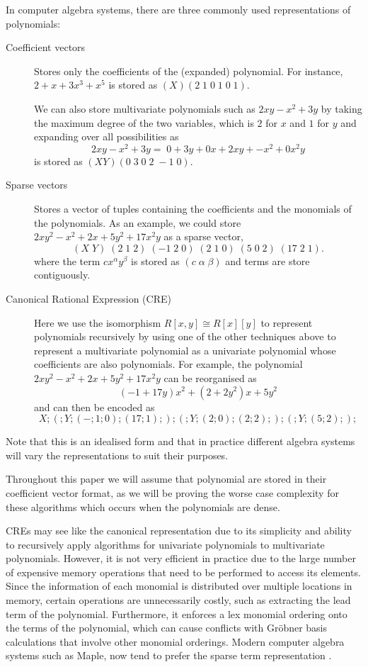 In computer algebra systems, there are three commonly used representations of polynomials:
\begin{description}
    \item[Coefficient vectors] Stores only the coefficients of the (expanded) polynomial. For instance, $2 + x + 3x^3 + x^5$ is stored as $(X) (2\; 1\; 0\; 1\; 0\; 1)$.

        We can also store multivariate polynomials such as $2xy - x^2 + 3y$ by taking the maximum degree of the two variables, which is $2$ for $x$ and $1$ for $y$ and expanding over all possibilities as
        \[
            2xy - x^2 + 3y = \;0 + 3y + 0x + 2xy + \minus x^2 + 0x^2y
        \]
        is stored as  $(X Y) (0\; 3\; 0\; 2\; \minus 1\; 0)$.
    \item[Sparse vectors] Stores a vector of tuples containing the coefficients and the monomials of the polynomials. As an example, we could store $2xy^2 - x^2 + 2x + 5y^2 + 17x^2 y$ as a sparse vector,
        \[
            (X\; Y)\; (2\; 1\; 2)\; (\minus 1\; 2\; 0)\; (2\; 1\; 0)\; (5\; 0\; 2)\; (17\; 2\; 1).
        \]
        where the term $c x^\alpha y^\beta$ is stored as $(c\; \alpha \; \beta)$ and terms are store contiguously.

    \item[Canonical Rational Expression (CRE)] Here we use the isomorphism $R[x, y] \cong R[x][y]$ to represent polynomials recursively by using one of the other techniques above to represent a multivariate polynomial as a univariate polynomial whose coefficients are also polynomials. For example, the polynomial $2xy^2 - x^2 + 2x + 5y^2 + 17x^2 y$ can be reorganised as
        \[
            (\minus 1 + 17y)x^2 + (2 + 2y^2)x + 5y^2
        \]
        and can then be encoded as
        \[
            X; (; Y; (\minus; 1; 0); (17; 1); ); (; Y; (2; 0); (2; 2); ); (; Y; (5; 2); );
        \]
\end{description}

Note that this is an idealised form and that in practice different algebra systems will vary the representations to suit their purposes.

Throughout this paper we will assume that polynomial are stored in their coefficient vector format, as we will be proving the worse case complexity for these algorithms which occurs when the polynomials are dense.

\medskip

CREs may see like the canonical representation due to its simplicity and ability to recursively apply algorithms for univariate polynomials to multivariate polynomials. However, it is not very efficient in practice due to the large number of expensive memory operations that need to be performed to access its elements. Since the information of each monomial is distributed over multiple locations in memory, certain operations are unnecessarily costly, such as extracting the lead term of the polynomial. Furthermore, it enforces a lex monomial ordering onto the terms of the polynomial, which can cause conflicts with Gr\"{o}bner basis calculations that involve other monomial orderings. Modern computer algebra systems such as Maple, now tend to prefer the sparse term representation \cite{maple-new-poly-structure}.

